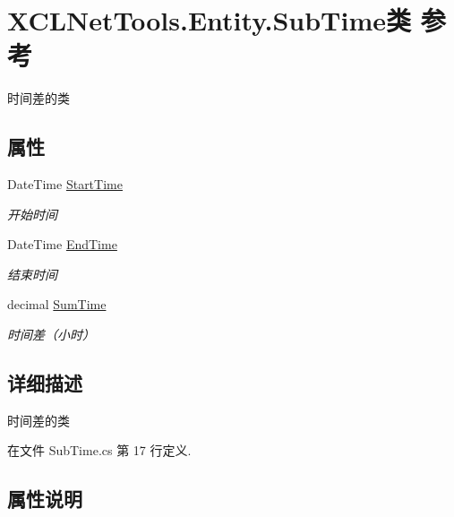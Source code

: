 \hypertarget{class_x_c_l_net_tools_1_1_entity_1_1_sub_time}{}\section{X\+C\+L\+Net\+Tools.\+Entity.\+Sub\+Time类 参考}
\label{class_x_c_l_net_tools_1_1_entity_1_1_sub_time}


时间差的类  


\subsection*{属性}
\begin{DoxyCompactItemize}
\item 
Date\+Time \hyperlink{class_x_c_l_net_tools_1_1_entity_1_1_sub_time_a7813c7a0874535abbe0b5307d7310c27}{Start\+Time}
\begin{DoxyCompactList}\small\item\em 开始时间 \end{DoxyCompactList}\item 
Date\+Time \hyperlink{class_x_c_l_net_tools_1_1_entity_1_1_sub_time_a286d907d4beb9e6153f1abdb6f2c95fd}{End\+Time}
\begin{DoxyCompactList}\small\item\em 结束时间 \end{DoxyCompactList}\item 
decimal \hyperlink{class_x_c_l_net_tools_1_1_entity_1_1_sub_time_afe5aa74e0038c4b4342be84211c3f607}{Sum\+Time}
\begin{DoxyCompactList}\small\item\em 时间差（小时） \end{DoxyCompactList}\end{DoxyCompactItemize}


\subsection{详细描述}
时间差的类 



在文件 Sub\+Time.\+cs 第 17 行定义.



\subsection{属性说明}
\mbox{\label{class_x_c_l_net_tools_1_1_entity_1_1_sub_time_a286d907d4beb9e6153f1abdb6f2c95fd}} 

